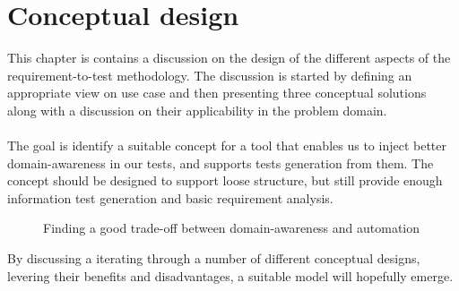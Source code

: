 \chapter{Conceptual design}
\label{chap:conceptual_design}
This chapter is contains a discussion on the design of the different aspects of the requirement-to-test methodology. The discussion is started by defining an appropriate view on use case and then presenting three conceptual solutions along with a discussion on their applicability in the problem domain.\\\\
The goal is identify a suitable concept for a tool that enables us to inject better domain-awareness in our tests, and supports tests generation from them.
The concept should be designed to support loose structure, but still provide enough information test generation and basic requirement analysis.
\begin{figure}[!htbp]
\centering

\caption{Finding a good trade-off between domain-awareness and automation}
\label{fig:project_parameter_plot_project}
\end{figure}By discussing a iterating through a number of different conceptual designs, levering their benefits and disadvantages, a suitable model will hopefully emerge.

